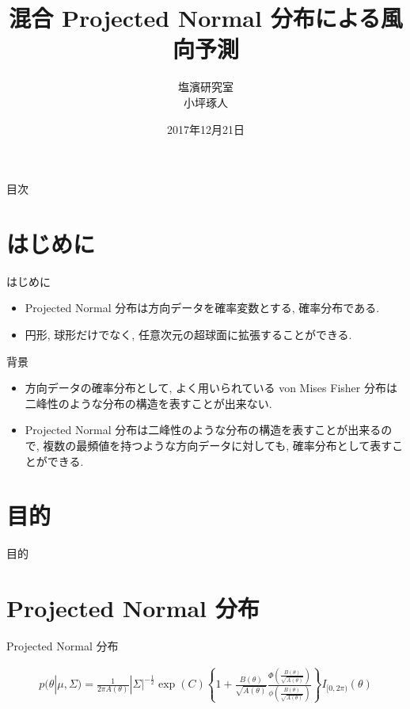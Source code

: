 \documentclass[dvipdfmx]{beamer}
\title[タイトル]{混合 Projected Normal 分布による風向予測}
\author[発表者名]{塩濱研究室\\ 小坪琢人}
\institute[所属]{東京理科大学\ 工学部経営工学科4年\\学籍番号 4414036}
\date[日付]{2017年12月21日}
\begin{document}
\begin{frame}[plain]
\titlepage
\end{frame}
	
\begin{frame}{目次}
\tableofcontents
\end{frame}

\section{はじめに}
\begin{frame}{はじめに}

\begin{itemize}

\item Projected Normal 分布は方向データを確率変数とする, 確率分布である.

\item 円形, 球形だけでなく, 任意次元の超球面に拡張することができる.

\end{itemize}

\end{frame}

\begin{frame}{背景}

\begin{itemize}

\item 方向データの確率分布として, よく用いられている von Mises Fisher 分布は二峰性のような分布の構造を表すことが出来ない.

\item  Projected Normal 分布は二峰性のような分布の構造を表すことが出来るので, 複数の最頻値を持つような方向データに対しても, 確率分布として表すことができる.

\end{itemize}


\end{frame}

\section{目的}
\begin{frame}{目的}
\cite{GPN}
\end{frame}

\section{Projected Normal 分布}
\begin{frame}{Projected Normal 分布}

\begin{eqnarray}
\label{PNC}
p(\theta|\mu, \Sigma) = \frac{1}{2\pi A(\theta)}|\Sigma|^{-\frac{1}{2}}
\exp(C)\left\{1 + \frac{B(\theta)}{\sqrt{A(\theta)}} \frac{\Phi \left(\frac{B(\theta)}{\sqrt{A(\theta)}}\right)}{\phi \left(\frac{B(\theta)}{\sqrt{A(\theta)}}\right)}\right\} I_{[0,2\pi)}(\theta)
\end{eqnarray}

\end{frame}
\end{document}
